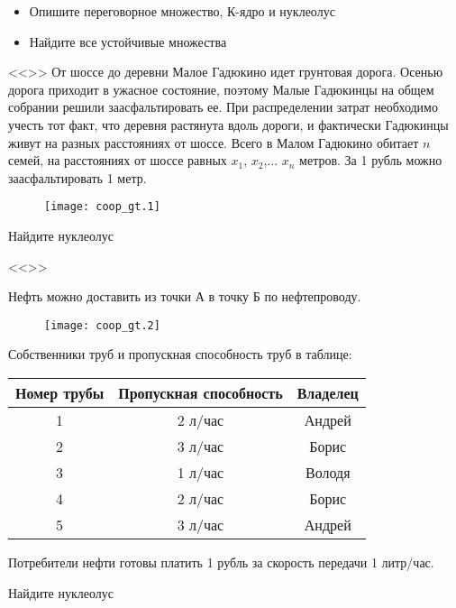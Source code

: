\begin{itemize}
\item Опишите переговорное множество, К-ядро и нуклеолус
\item Найдите все устойчивые множества
\end{itemize}

\vspace{5pt} <<>>
От шоссе до деревни Малое Гадюкино идет грунтовая дорога. Осенью дорога приходит в ужасное состояние, поэтому Малые Гадюкинцы на общем собрании решили заасфальтировать ее. При распределении затрат необходимо учесть тот факт, что деревня растянута вдоль дороги, и фактически Гадюкинцы живут на разных расстояниях от шоссе. Всего в Малом Гадюкино обитает  $n$  семей, на расстояниях от шоссе равных  $x_{1}$,  $x_{2}$,...  $x_{n}$ метров. За 1 рубль можно заасфальтировать 1 метр.


\begin{figure}[htbp]
    \texttt{[image: coop\_gt.1]}
\end{figure}


Найдите нуклеолус


\vspace{5pt} <<>>

Нефть можно доставить из точки А в точку Б по нефтепроводу. 

\begin{figure}[htbp]
    \texttt{[image: coop\_gt.2]}
\end{figure}

Собственники труб и пропускная способность труб в таблице:

\begin{tabular}{|c|c|c|}

\hline 
Номер трубы & Пропускная способность & Владелец \\
\hline
1 & 2 л/час & Андрей \\
2 & 3 л/час & Борис \\
3 & 1 л/час & Володя \\
4 & 2 л/час & Борис \\
5 & 3 л/час & Андрей \\
\hline
\end{tabular}

Потребители нефти готовы платить 1 рубль за скорость передачи 1 литр/час. 

Найдите нуклеолус

